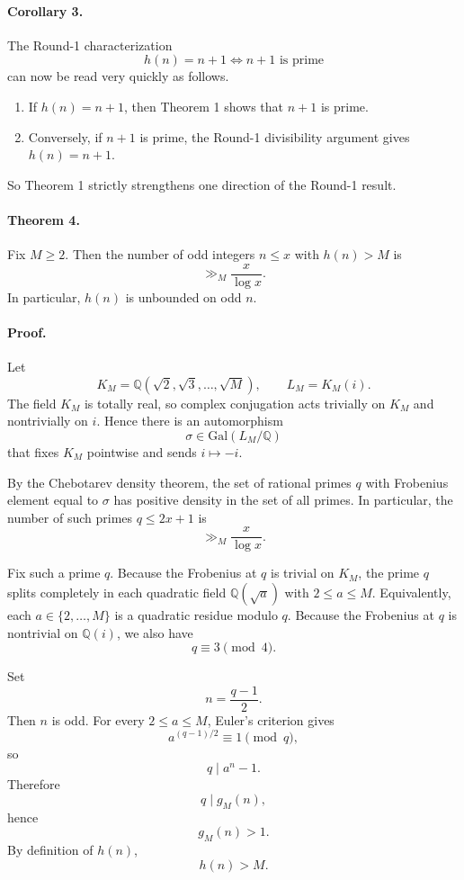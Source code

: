 \paragraph{Corollary 3.}
The Round-1 characterization
\[
h(n)=n+1 \iff n+1 \text{ is prime}
\]
can now be read very quickly as follows.

\begin{enumerate}
\item If $h(n)=n+1$, then Theorem 1 shows that $n+1$ is prime.
\item Conversely, if $n+1$ is prime, the Round-1 divisibility argument gives $h(n)=n+1$.
\end{enumerate}

So Theorem 1 strictly strengthens one direction of the Round-1 result.

\paragraph{Theorem 4.}
Fix $M\ge 2$.
Then the number of odd integers $n\le x$ with $h(n)>M$ is
\[
\gg_M \frac{x}{\log x}.
\]
In particular, $h(n)$ is unbounded on odd $n$.

\paragraph{Proof.}
Let
\[
K_M=\mathbb Q(\sqrt 2,\sqrt 3,\dots,\sqrt M),
\qquad
L_M=K_M(i).
\]
The field $K_M$ is totally real, so complex conjugation acts trivially on $K_M$ and nontrivially on $i$.
Hence there is an automorphism
\[
\sigma\in \mathrm{Gal}(L_M/\mathbb Q)
\]
that fixes $K_M$ pointwise and sends $i\mapsto -i$.

By the Chebotarev density theorem, the set of rational primes $q$ with Frobenius element equal to $\sigma$ has positive density in the set of all primes.
In particular, the number of such primes $q\le 2x+1$ is
\[
\gg_M \frac{x}{\log x}.
\]

Fix such a prime $q$.
Because the Frobenius at $q$ is trivial on $K_M$, the prime $q$ splits completely in each quadratic field $\mathbb Q(\sqrt a)$ with $2\le a\le M$.
Equivalently, each $a\in\{2,\dots,M\}$ is a quadratic residue modulo $q$.
Because the Frobenius at $q$ is nontrivial on $\mathbb Q(i)$, we also have
\[
q\equiv 3\pmod 4.
\]

Set
\[
n=\frac{q-1}{2}.
\]
Then $n$ is odd.
For every $2\le a\le M$, Euler's criterion gives
\[
a^{(q-1)/2}\equiv 1\pmod q,
\]
so
\[
q\mid a^n-1.
\]
Therefore
\[
q\mid g_M(n),
\]
hence
\[
g_M(n)>1.
\]
By definition of $h(n)$,
\[
h(n)>M.
\]

